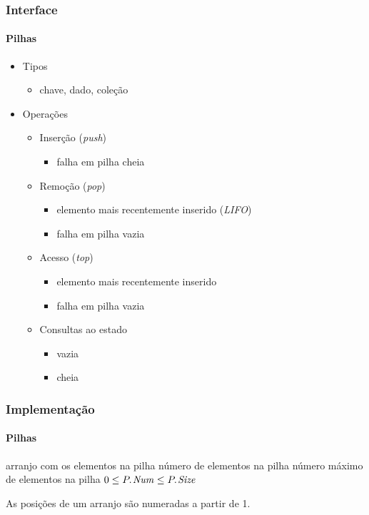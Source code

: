 \documentclass{beamer}
\begin{document}
\begin{frame}
  \frametitle{Interface}
  \framesubtitle{Pilhas}

  \begin{itemize}
    \item Tipos
      \begin{itemize}
        \item chave, dado, coleção
      \end{itemize}
    \item Operações
      \begin{itemize}
        \item Inserção (\textit{push\/})
          \begin{itemize}
            \item falha em pilha cheia
          \end{itemize}
        \item Remoção (\textit{pop\/})
          \begin{itemize}
            \item elemento mais recentemente inserido (\textit{LIFO\/})
            \item falha em pilha vazia
          \end{itemize}
        \item Acesso  (\textit{top\/})
          \begin{itemize}
            \item elemento mais recentemente inserido
            \item falha em pilha vazia
          \end{itemize}
        \item Consultas ao estado
          \begin{itemize}
          \item vazia
          \item cheia
          \end{itemize}
      \end{itemize}
  \end{itemize}
\end{frame}

\begin{frame}

  \frametitle{Implementação}
  \framesubtitle{Pilhas}

  \begin{codebox}
    \zi {} \> \> \> \Comment arranjo com os elementos na pilha
    \zi {}  \> \> \> \Comment número de elementos na pilha
    \zi {} \> \> \> \Comment número máximo de elementos na pilha
    \zi $0 \le \attrib{P}{Num} \le \attrib{P}{Size}$
  \end{codebox}
  As posições de um arranjo são numeradas a partir de 1.
\end{frame}
\end{document}
